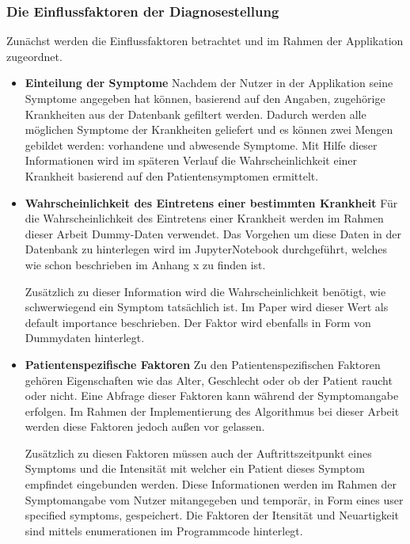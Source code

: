 \subsubsection{Die Einflussfaktoren der Diagnosestellung}
Zunächst werden die Einflussfaktoren betrachtet und im Rahmen der Applikation zugeordnet.
\begin{itemize}
	\item \textbf{Einteilung der Symptome}
	\newline
	Nachdem der Nutzer in der Applikation seine Symptome angegeben hat können, basierend auf den Angaben, zugehörige Krankheiten aus der Datenbank gefiltert werden. Dadurch werden alle möglichen Symptome der Krankheiten geliefert und es können zwei Mengen gebildet werden: vorhandene und abwesende Symptome. Mit Hilfe dieser Informationen wird im späteren Verlauf die Wahrscheinlichkeit einer Krankheit basierend auf den Patientensymptomen ermittelt.

	\item \textbf{Wahrscheinlichkeit des Eintretens einer bestimmten Krankheit}
	\newline
	Für die Wahrscheinlichkeit des Eintretens einer Krankheit werden im Rahmen dieser Arbeit Dummy-Daten verwendet. Das Vorgehen um diese Daten in der Datenbank zu hinterlegen wird im JupyterNotebook durchgeführt, welches wie schon beschrieben im Anhang x zu finden ist. 
	
	Zusätzlich zu dieser Information wird die Wahrscheinlichkeit benötigt, wie schwerwiegend ein Symptom tatsächlich ist. Im Paper wird dieser Wert als default importance beschrieben. Der Faktor wird ebenfalls in Form von Dummydaten hinterlegt.
	
	\item \textbf{Patientenspezifische Faktoren}
	\newline
	Zu den Patientenspezifischen Faktoren gehören Eigenschaften wie das Alter, Geschlecht oder ob der Patient raucht oder nicht. Eine Abfrage dieser Faktoren kann während der Symptomangabe erfolgen. Im Rahmen der Implementierung des Algorithmus bei dieser Arbeit werden diese Faktoren jedoch außen vor gelassen.
	
	Zusätzlich zu diesen Faktoren müssen auch der Auftrittszeitpunkt eines Symptoms und die Intensität mit welcher ein Patient dieses Symptom empfindet eingebunden werden. Diese Informationen werden im Rahmen der Symptomangabe vom Nutzer mitangegeben und temporär, in Form eines user specified symptoms, gespeichert. Die Faktoren der Itensität und Neuartigkeit sind mittels enumerationen im Programmcode hinterlegt. 
	

\end{itemize}
